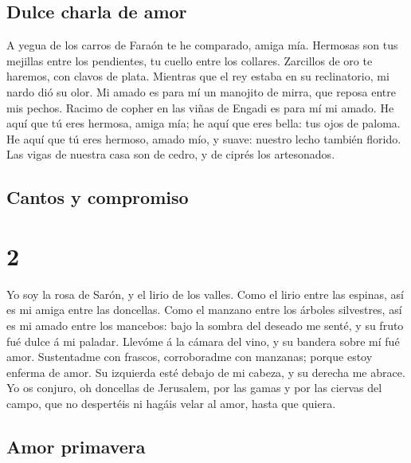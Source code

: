\hypertarget{dulce-charla-de-amor}{%
\subsection{Dulce charla de amor}\label{dulce-charla-de-amor}}

 A yegua de los carros de Faraón te he comparado, amiga
mía.  Hermosas son tus mejillas entre los pendientes, tu
cuello entre los collares.  Zarcillos de oro te haremos,
con clavos de plata.  Mientras que el rey estaba en su
reclinatorio, mi nardo dió su olor.  Mi amado es para mí
un manojito de mirra, que reposa entre mis pechos. 
Racimo de copher en las viñas de Engadi es para mí mi amado.
 He aquí que tú eres hermosa, amiga mía; he aquí que eres
bella: tus ojos de paloma.  He aquí que tú eres hermoso,
amado mío, y suave: nuestro lecho también florido.  Las
vigas de nuestra casa son de cedro, y de ciprés los artesonados.

\hypertarget{cantos-y-compromiso}{%
\subsection{Cantos y compromiso}\label{cantos-y-compromiso}}

\hypertarget{section-1}{%
\section{2}\label{section-1}}

 Yo soy la rosa de Sarón, y el lirio de los valles.
 Como el lirio entre las espinas, así es mi amiga entre
las doncellas.  Como el manzano entre los árboles
silvestres, así es mi amado entre los mancebos: bajo la sombra del
deseado me senté, y su fruto fué dulce á mi paladar. 
Llevóme á la cámara del vino, y su bandera sobre mí fué amor.
 Sustentadme con frascos, corroboradme con manzanas;
porque estoy enferma de amor.  Su izquierda esté debajo de
mi cabeza, y su derecha me abrace.  Yo os conjuro, oh
doncellas de Jerusalem, por las gamas y por las ciervas del campo, que
no despertéis ni hagáis velar al amor, hasta que quiera.

\hypertarget{amor-primavera}{%
\subsection{Amor primavera}\label{amor-primavera}}

